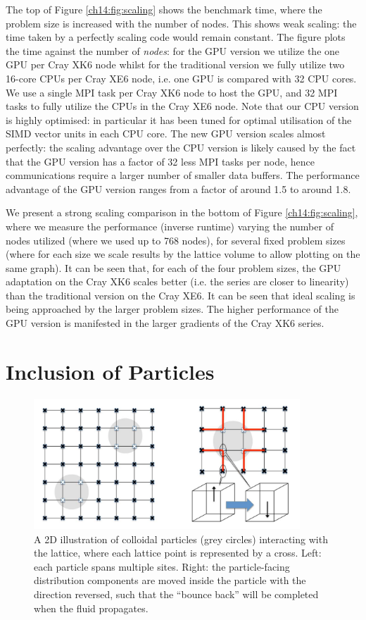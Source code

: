 The top of Figure \ref{ch14:fig:scaling} shows the benchmark time,
where the problem size is increased with the number of nodes. This
shows weak scaling: the time taken by a perfectly scaling code would
remain constant. The figure plots the time against the number of {\it
  nodes}: for the GPU version we utilize the one GPU per Cray XK6 node
whilst for the traditional version we fully utilize two 16-core CPUs
per Cray XE6 node, i.e. one GPU is compared with 32 CPU cores.  We use
a single MPI task per Cray XK6 node to host the GPU, and 32 MPI tasks
to fully utilize the CPUs in the Cray XE6 node.  Note that our CPU
version is highly optimised: in particular it has been tuned for
optimal utilisation of the SIMD vector units in each CPU core.
The new GPU version scales almost perfectly: the scaling advantage
over the CPU version is likely caused by the fact that the GPU version
has a factor of 32 less MPI tasks per node, hence communications
require a larger number of smaller data buffers. The performance
advantage of the GPU version ranges from a factor of around 1.5 to
around 1.8.  

We present a strong scaling comparison in the bottom of Figure
\ref{ch14:fig:scaling}, where we measure the performance (inverse
runtime) varying the number of nodes utilized (where we used up to 768
nodes), for several fixed problem sizes (where for each size we scale
results by the lattice volume to allow plotting on the same graph).
It can be seen that, for each of the four problem sizes, the GPU
adaptation on the Cray XK6 scales better (i.e.  the series are closer
to linearity) than the traditional version on the Cray XE6.  It can be
seen that ideal scaling is being approached by the larger problem
sizes.  The higher performance of the GPU version is manifested in the
larger gradients of the Cray XK6 series.

\section{Inclusion of Particles}\label{ch14:sec:particles}

\begin{figure}[t]
\centering
\includegraphics[width=10cm]{Chapters/chapter14/figures/bbl}
\caption{A 2D illustration of colloidal particles (grey circles)
  interacting with the lattice, where each lattice point is
  represented by a cross. Left: each particle spans multiple sites.
  Right: the particle-facing distribution components are moved inside
  the particle with the direction reversed, such that the ``bounce
  back'' will be completed when the fluid propagates.}
\label{ch14:fig:bbl}
\end{figure}


